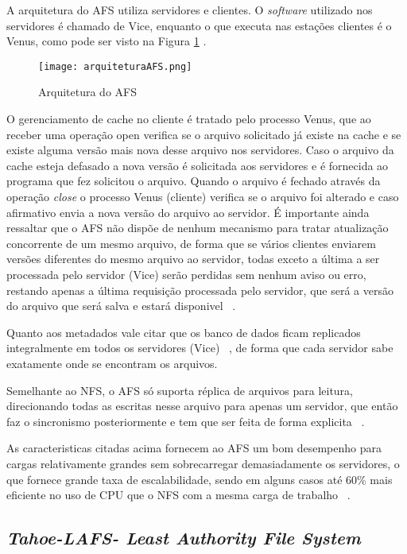     A arquitetura do AFS utiliza servidores e clientes. O \textit{software} utilizado nos servidores é chamado de Vice, enquanto o que executa nas estações clientes é o Venus, como pode ser visto na Figura \ref{fig:arquiteturaAFS} .
    
    \begin{figure}[h]
        \centering
        \texttt{[image: arquiteturaAFS.png]}
        \caption{Arquitetura do AFS ~\cite{coulouris}}
        \label{fig:arquiteturaAFS}
    \end{figure}
    
    O gerenciamento de cache no cliente é tratado pelo processo Venus, que ao receber uma operação open verifica se o arquivo solicitado já existe na cache e se existe alguma versão mais nova desse arquivo nos servidores. Caso o arquivo da cache esteja defasado a nova versão é solicitada aos servidores e é fornecida ao programa que fez solicitou o arquivo. Quando o arquivo é fechado através da operação \textit{close} o processo Venus (cliente) verifica se o arquivo foi alterado e caso afirmativo envia a nova versão do arquivo ao servidor. É importante ainda ressaltar que o AFS não dispõe de nenhum mecanismo para tratar atualização concorrente de um mesmo arquivo, de forma que se vários clientes enviarem versões diferentes do mesmo arquivo ao servidor, todas exceto a última a ser processada pelo servidor (Vice) serão perdidas sem nenhum aviso ou erro, restando apenas a última requisição processada pelo servidor, que será a versão do arquivo que será salva e estará disponivel ~\cite{coulouris}.
    
    Quanto aos metadados vale citar que os banco de dados ficam replicados integralmente em todos os servidores (Vice) ~\cite{coulouris}, de forma que cada servidor sabe exatamente onde se encontram os arquivos.
    
    Semelhante ao NFS, o AFS só suporta réplica de arquivos para leitura, direcionando todas as escritas nesse arquivo para apenas um servidor, que então faz o sincronismo posteriormente e tem que ser feita de forma explicita ~\cite{coulouris}.
    
    As caracteristicas citadas acima fornecem ao AFS um bom desempenho para cargas relativamente grandes sem sobrecarregar demasiadamente os servidores, o que fornece grande taxa de escalabilidade, sendo em alguns casos até 60\% mais eficiente no uso de CPU que o NFS com a mesma carga de trabalho ~\cite{coulouris}.
    
    \subsection{\textit{Tahoe-LAFS- Least Authority File System}}
    
